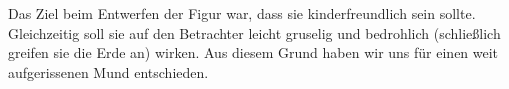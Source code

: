 Das Ziel beim Entwerfen der Figur war, dass sie kinderfreundlich sein sollte. Gleichzeitig soll sie auf den Betrachter leicht gruselig und bedrohlich (schließlich greifen sie die Erde an) wirken. Aus diesem Grund haben wir uns für einen weit aufgerissenen Mund entschieden. 

